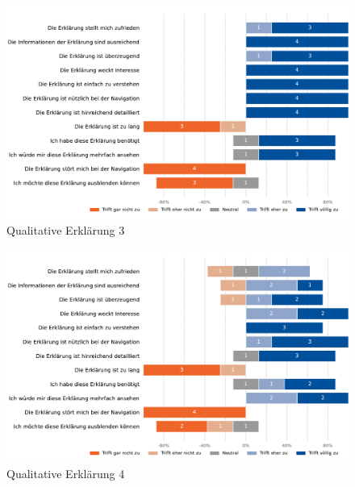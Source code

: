 \begin{figure}[htb!]
    \centering
    \includegraphics[width=\textwidth]{contents/06_model_evaluation/02_evaluation/res/qualitativeFeedback-03_traffic_volume.pdf}
    \caption{Qualitative Erklärung 3}
    \label{fig:qualitative_evaluation_explanation3}
\end{figure}

\begin{figure}[htb!]
    \centering
    \includegraphics[width=\textwidth]{contents/06_model_evaluation/02_evaluation/res/qualitativeFeedback-04_position_accuracy.pdf}
    \caption{Qualitative Erklärung 4}
    \label{fig:qualitative_evaluation_explanation4}
\end{figure}